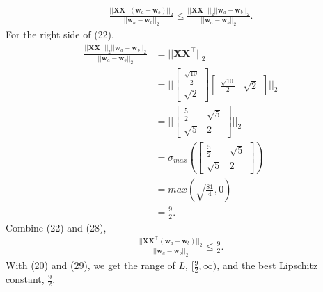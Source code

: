 \documentclass[10pt]{article}
\begin{document}
\begin{enumerate}[1)]
\begin{align}
\frac{||\pmb{X}\pmb{X}^\top(\pmb{w}_a-\pmb{w}_b)||_2}{||\pmb{w}_a-\pmb{w}_b||_2}\leq
\frac{||\pmb{X}\pmb{X}^\top||_2||\pmb{w}_a-\pmb{w}_b||_2}{||\pmb{w}_a-\pmb{w}_b||_2}.
\end{align}
For the right side of (22),
\begin{align}
\frac{||\pmb{X}\pmb{X}^\top||_2||\pmb{w}_a-\pmb{w}_b||_2}{||\pmb{w}_a-\pmb{w}_b||_2}&=||\pmb{X}\pmb{X}^\top||_2\\
&=||
  \begin{bmatrix}
    \frac{\sqrt{10}}{2}\\
    \sqrt{2}
  \end{bmatrix}
  \begin{bmatrix}
    \frac{\sqrt{10}}{2} & \sqrt{2}
  \end{bmatrix}||_2\\
&=||
  \begin{bmatrix}
    \frac{5}{2} & \sqrt{5}\\
    \sqrt{5} & 2
  \end{bmatrix}||_2\\
&=\sigma_{max}(
  \begin{bmatrix}
    \frac{5}{2} & \sqrt{5}\\
    \sqrt{5} & 2
  \end{bmatrix})\\
&=max(\sqrt{\frac{81}{4}},0)\\
&=\frac{9}{2}.
\end{align}
Combine (22) and (28),
\begin{align}
\frac{||\pmb{X}\pmb{X}^\top(\pmb{w}_a-\pmb{w}_b)||_2}{||\pmb{w}_a-\pmb{w}_b||_2}\leq\frac{9}{2}.
\end{align}
With (20) and (29), we get the range of $L$,
$[\frac{9}{2},\infty)$, and the best Lipschitz constant, $\frac{9}{2}$.

\end{enumerate}
\vspace{3mm}
\end{document}

